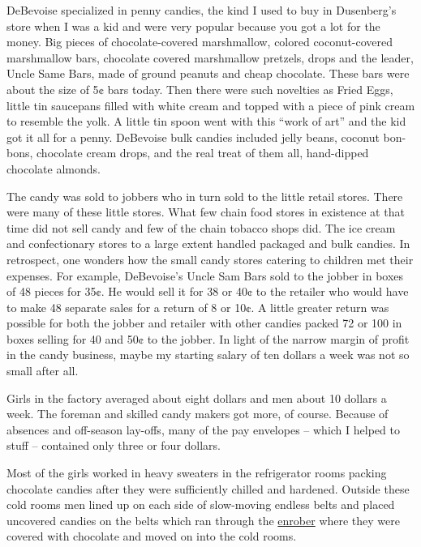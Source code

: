 \documentclass[12pt]{book}              %
\begin{document}
DeBevoise specialized in penny candies, the kind I used to buy in Dusenberg's store when I was a kid and were very popular because you got a lot for the money. Big pieces of chocolate-covered marshmallow, colored coconut-covered marshmallow bars, chocolate covered marshmallow pretzels, drops and the leader, Uncle Same Bars, made of ground peanuts and cheap chocolate. These bars were about the size of 5$\cent$ bars today. Then there were such novelties as Fried Eggs, little tin saucepans filled with white cream and topped with a piece of pink cream to resemble the yolk. A little tin spoon went with this ``work of art'' and the kid got it all for a penny. DeBevoise bulk candies included jelly beans, coconut bon-bons, chocolate cream drops, and the real treat of them all, hand-dipped chocolate almonds.

The candy was sold to jobbers who in turn sold to the little retail stores. There were many of these little stores. What few chain food stores in existence at that time did not sell candy and few of the chain tobacco shops did. The ice cream and confectionary stores to a large extent handled packaged and bulk candies. In retrospect, one wonders how the small candy stores catering to children met their expenses. For example, DeBevoise's Uncle Sam Bars sold to the jobber in boxes of 48 pieces for 35$\cent$. He would sell it for 38 or 40$\cent$ to the retailer who would have to make 48 separate sales for a return of 8 or 10$\cent$. A little greater return was possible for both the jobber and retailer with other candies packed 72 or 100 in boxes selling for 40 and 50$\cent$ to the jobber. In light of the narrow margin of profit in the candy business, maybe my starting salary of ten dollars a week was not so small after all.

Girls in the factory averaged about eight dollars and men about 10 dollars a week. The foreman and skilled candy makers got more, of course. Because of absences and off-season lay-offs, many of the pay envelopes -- which I helped to stuff -- contained only three or four dollars. 

Most of the girls worked in heavy sweaters in the refrigerator rooms packing chocolate candies after they were sufficiently chilled and hardened. Outside these cold rooms men lined up on each side of slow-moving endless belts and placed uncovered candies on the belts which ran through the \href{http://en.wikipedia.org/wiki/Enrober}{enrober} where they were covered with chocolate and moved on into the cold rooms.
\end{document}

